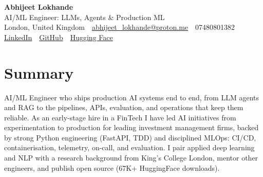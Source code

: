 \documentclass[10pt,a4paper]{article}
\newcommand{\sep}{\,\textcolor{accent!60}{\textbar}\,}
\begin{document}
\begin{center}
  {\fontsize{24}{26}\selectfont\bfseries Abhijeet Lokhande}\\[3pt]
  {\color{accent}\large AI/ML Engineer: LLMs, Agents \& Production ML}\\[5pt]
  {\small
    London, United Kingdom \sep
    \href{mailto:abhijeet_lokhande@proton.me}{abhijeet\_lokhande@proton.me} \sep
    07480801382 \\[2pt]
    \href{https://www.linkedin.com/in/ablds/}{LinkedIn} \sep
    \href{https://github.com/abhijeetscode}{GitHub} \sep
    \href{https://huggingface.co/ab-ai}{Hugging Face}
  }
\end{center}
\vspace{2pt}

\section{Summary}
AI/ML Engineer who ships production AI systems end to end, from LLM agents and RAG to the pipelines, APIs, evaluation, and operations that keep them reliable. As an early-stage hire in a FinTech I have led AI initiatives from experimentation to production for leading investment management firms, backed by strong Python engineering (FastAPI, TDD) and disciplined MLOps: CI/CD, containerisation, telemetry, on-call, and evaluation. I pair applied deep learning and NLP with a research background from King's College London, mentor other engineers, and publish open source (67K+ HuggingFace downloads).

\end{document}
